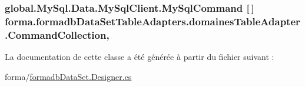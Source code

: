 \subsubsection[{\texorpdfstring{Command\+Collection}{CommandCollection}}]{\setlength{\rightskip}{0pt plus 5cm}global.\+My\+Sql.\+Data.\+My\+Sql\+Client.\+My\+Sql\+Command \mbox{[}$\,$\mbox{]} forma.\+formadb\+Data\+Set\+Table\+Adapters.\+domaines\+Table\+Adapter.\+Command\+Collection\hspace{0.3cm}{\ttfamily [get]}, {\ttfamily [protected]}}\hypertarget{classforma_1_1formadb_data_set_table_adapters_1_1domaines_table_adapter_afec7c0caa6550f23bbd36e190a0e23ab}{}\label{classforma_1_1formadb_data_set_table_adapters_1_1domaines_table_adapter_afec7c0caa6550f23bbd36e190a0e23ab}


La documentation de cette classe a été générée à partir du fichier suivant \+:\begin{DoxyCompactItemize}
\item 
forma/\hyperlink{formadb_data_set_8_designer_8cs}{formadb\+Data\+Set.\+Designer.\+cs}\end{DoxyCompactItemize}
